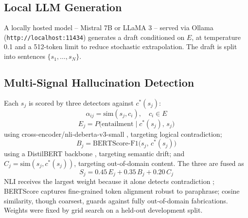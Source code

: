 \documentclass[conference]{IEEEtran}
\begin{document}
\subsection{Local LLM Generation}
A locally hosted model -- Mistral 7B \cite{jiang2023mistral} or LLaMA 3 \cite{touvron2023llama} -- served via Ollama (\texttt{http://localhost:11434}) generates a draft conditioned on $E$, at temperature 0.1 and a 512-token limit to reduce stochastic extrapolation. The draft is split into sentences $\{s_1,\ldots,s_N\}$.

\subsection{Multi-Signal Hallucination Detection}
Each $s_j$ is scored by three detectors against $c^{*}(s_j)$:
\begin{equation}
\alpha_{ij} = \mathrm{sim}(s_j, c_i), \quad c_i \in E
\label{eq:attribution2}
\end{equation}
\begin{equation}
E_j = P\big(\mathrm{entailment} \mid c^{*}(s_j),\, s_j\big)
\label{eq:nli}
\end{equation}
using cross-encoder/nli-deberta-v3-small \cite{he2023debertav3}, targeting logical contradiction;
\begin{equation}
B_j = \mathrm{BERTScore\mbox{-}F1}\big(s_j,\, c^{*}(s_j)\big)
\label{eq:bertscore}
\end{equation}
using a DistilBERT backbone \cite{sanh2019distilbert,zhang2020bertscore}, targeting semantic drift; and $C_j = \mathrm{sim}(s_j, c^{*}(s_j))$, targeting out-of-domain content. The three are fused as
\begin{equation}
S_j = 0.45\,E_j + 0.35\,B_j + 0.20\,C_j
\label{eq:support}
\end{equation}
NLI receives the largest weight because it alone detects contradiction \cite{laban2022summac}; BERTScore captures fine-grained token alignment robust to paraphrase; cosine similarity, though coarsest, guards against fully out-of-domain fabrications. Weights were fixed by grid search on a held-out development split.
\end{document}
